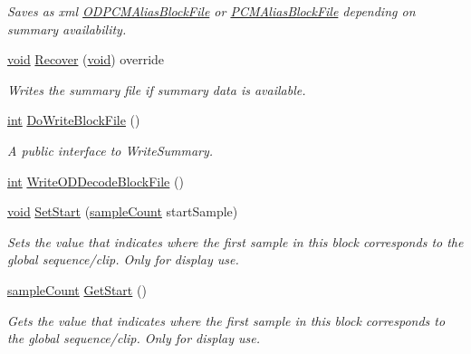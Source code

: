 \begin{DoxyCompactItemize}
\begin{DoxyCompactList}\small\item\em Saves as xml \hyperlink{class_o_d_p_c_m_alias_block_file}{O\+D\+P\+C\+M\+Alias\+Block\+File} or \hyperlink{class_p_c_m_alias_block_file}{P\+C\+M\+Alias\+Block\+File} depending on summary availability. \end{DoxyCompactList}\item 
\hyperlink{sound_8c_ae35f5844602719cf66324f4de2a658b3}{void} \hyperlink{class_o_d_decode_block_file_a638c05affdeb4eb90753b3729741012d}{Recover} (\hyperlink{sound_8c_ae35f5844602719cf66324f4de2a658b3}{void}) override
\begin{DoxyCompactList}\small\item\em Writes the summary file if summary data is available. \end{DoxyCompactList}\item 
\hyperlink{xmltok_8h_a5a0d4a5641ce434f1d23533f2b2e6653}{int} \hyperlink{class_o_d_decode_block_file_a12eb93362481f65a46c22618dc5a0161}{Do\+Write\+Block\+File} ()
\begin{DoxyCompactList}\small\item\em A public interface to Write\+Summary. \end{DoxyCompactList}\item 
\hyperlink{xmltok_8h_a5a0d4a5641ce434f1d23533f2b2e6653}{int} \hyperlink{class_o_d_decode_block_file_af2da3242fb46ddf430409831a7148612}{Write\+O\+D\+Decode\+Block\+File} ()
\item 
\hyperlink{sound_8c_ae35f5844602719cf66324f4de2a658b3}{void} \hyperlink{class_o_d_decode_block_file_acab5d1ed0f079c934b69a3caf44631f5}{Set\+Start} (\hyperlink{include_2audacity_2_types_8h_afa427e1f521ea5ec12d054e8bd4d0f71}{sample\+Count} start\+Sample)
\begin{DoxyCompactList}\small\item\em Sets the value that indicates where the first sample in this block corresponds to the global sequence/clip. Only for display use. \end{DoxyCompactList}\item 
\hyperlink{include_2audacity_2_types_8h_afa427e1f521ea5ec12d054e8bd4d0f71}{sample\+Count} \hyperlink{class_o_d_decode_block_file_ac47facfa6a17e8db263b7004faea00f7}{Get\+Start} ()
\begin{DoxyCompactList}\small\item\em Gets the value that indicates where the first sample in this block corresponds to the global sequence/clip. Only for display use. \end{DoxyCompactList}\item 

\end{DoxyCompactItemize}
